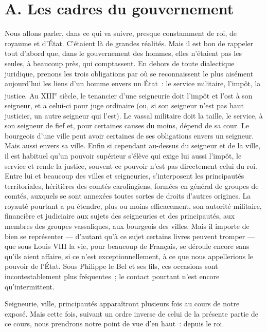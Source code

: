 \documentclass[french,twoside]{book} %
\begin{document}
\section[{A. Les cadres du gouvernement}]{A. Les cadres du gouvernement}
\label{c03a}
\noindent  {}
\label{p11} Nous allons parler, dans ce qui va suivre, presque constamment de roi, de royaume et d’État. C’étaient là de grandes réalités. Mais il est bon de rappeler tout d’abord que, dans le gouvernement des hommes, elles n’étaient pas les seules, à beaucoup près, qui comptassent. En dehors de toute dialectique juridique, prenons les trois obligations par où se reconnaissent le plus aisément aujourd’hui les liens d’un homme envers un État : le service militaire, l’impôt, la justice. Au XIII\textsuperscript{e} siècle, le tenancier d’une seigneurie doit l’impôt et l’ost à son seigneur, et a celui-ci pour juge ordinaire (ou, si son seigneur n’est pas haut justicier, un autre seigneur qui l’est). Le vassal militaire doit la taille, le service, à son seigneur de fief et, pour certaines causes du moins, dépend de sa cour. Le bourgeois d’une ville peut avoir certaines de ses obligations envers un seigneur. Mais aussi envers sa ville. Enfin si cependant au-dessus du seigneur et de la ville, il est habituel qu’un pouvoir supérieur s’élève qui exige lui aussi l’impôt, le service et rende la justice, souvent ce pouvoir n’est pas directement celui du roi. Entre lui et beaucoup des villes et seigneuries, s’interposent les principautés territoriales, héritières des comtés carolingiens, formées en général de groupes de comtés,  
\label{p12} auxquels se sont annexées toutes sortes de droits d’autres origines. La royauté pourtant a pu étendre, plus ou moins efficacement, son autorité militaire, financière et judiciaire aux sujets des seigneuries et des principautés, aux membres des groupes vassaliques, aux bourgeois des villes. Mais il importe de bien se représenter — d’autant qu’à ce sujet certains livres peuvent tromper — que sous Louis VIII la vie, pour beaucoup de Français, se déroule encore sans qu’ils aient affaire, si ce n’est exceptionnellement, à ce que nous appellerions le pouvoir de l’État. Sous Philippe le Bel et ses fils, ces occasions sont incontestablement plus fréquentes ; le contact pourtant n’est encore qu’intermittent.\par
Seigneurie, ville, principautés apparaîtront plusieurs fois au cours de notre exposé. Mais cette fois, suivant un ordre inverse de celui de la présente partie de ce cours, nous prendrons notre point de vue d’en haut : depuis le roi.
\end{document}
